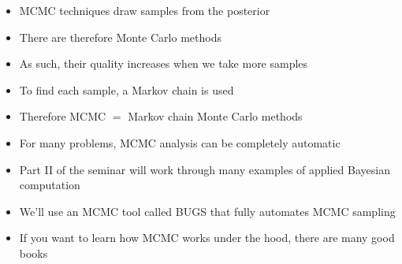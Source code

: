 \documentclass{beamer}
\begin{document}
\begin{frame}
  \begin{itemize}
    \item{MCMC techniques draw samples from the posterior}
    \item{There are therefore Monte Carlo methods}
    \item{As such, their quality increases when we take more samples}
    \item{To find each sample, a Markov chain is used}
    \item{Therefore MCMC $=$ Markov chain Monte Carlo methods}
  \end{itemize}
\end{frame}

\begin{frame}
  \begin{itemize}
    \item{For many problems, MCMC analysis can be completely automatic}
    \item{Part II of the seminar will work through many examples of applied Bayesian computation}
    \item{We'll use an MCMC tool called BUGS that fully automates MCMC sampling}
    \item{If you want to learn how MCMC works under the hood, there are many good books}
  \end{itemize}
\end{frame}
\end{document}

